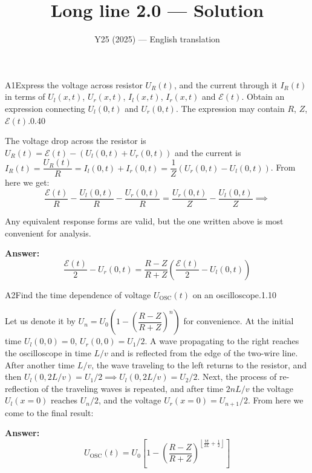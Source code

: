 \documentclass[11pt,a4paper]{article}
\title{\textbf{Long line 2.0 --- Solution}}
\author{\normalsize Y25 (2025) — English translation}
\date{}
\begin{document}
\maketitle\vspace{-0.5em}
\begin{solcard}{A1}{Express the voltage across resistor $U_R(t)$, and the current through it $I_R(t)$ in terms of $U_l(x, t)$, $U_r(x, t)$, $I_l(x, t)$, $I_r(x, t)$ and $\mathcal E(t)$. Obtain an expression connecting $U_l(0, t)$ and $U_r(0, t)$. The expression may contain $R$, $Z$, $\mathcal E(t)$.}{0.40}

The voltage drop across the resistor is $U_R(t)=\mathcal E(t)-(U_l(0,t)+U_r(0,t))$ and the current is $I_R(t)=\dfrac{U_R(t)}{R}=I_l(0,t) + I_r(0,t)=\dfrac{1}{Z}\left(U_r(0,t)-U_l(0,t)\right)$. From here we get: \[\dfrac{\mathcal E(t)}{R}-\dfrac{U_l(0,t)}{R}-\dfrac{U_r(0,t)}{R}=\dfrac{U_r(0,t)}{Z}-\dfrac{U_l(0,t)}{Z}\implies\]


Any equivalent response forms are valid, but the one written above is most convenient for analysis.

\par\smallskip\noindent\textbf{Answer:} \[\dfrac{\mathcal E(t)}{2}-U_r(0,t)=\dfrac{R-Z}{R+Z}\left(\dfrac{\mathcal E(t)}{2}-U_l(0,t)\right)\]
\end{solcard}

\begin{solcard}{A2}{Find the time dependence of voltage $U_\mathrm{OSC}(t)$ on an oscilloscope.}{1.10}

Let us denote it by $U_n=U_0\left(1-\left(\dfrac{R-Z}{R+Z}\right)^n\right)$ for convenience. At the initial time $U_l(0,0)=0$, $U_r(0,0)=U_1/2$. A wave propagating to the right reaches the oscilloscope in time $L/v$ and is reflected from the edge of the two-wire line. After another time $L/v$, the wave traveling to the left returns to the resistor, and then $U_l(0,2L/v)=U_1/2\implies U_l(0,2L/v)=U_2/2$. Next, the process of re-reflection of the traveling waves is repeated, and after time $2nL/v$ the voltage $U_l(x=0)$ reaches $U_n/2$, and the voltage $U_r(x=0)=U_{n+1}/2$. From here we come to the final result:

\par\smallskip\noindent\textbf{Answer:} \[U_\mathrm{OSC}(t)=U_0\left[1-\left(\dfrac{R-Z}{R+Z}\right)^{\left\lfloor\frac{Vt}{2L}+\frac{1}{2}\right\rfloor}\right]\]
\end{solcard}
\end{document}
